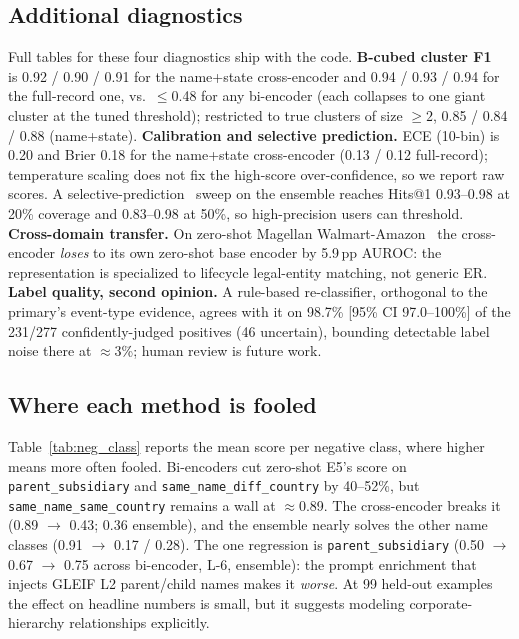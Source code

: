 \documentclass[sigconf]{acmart}
\begin{document}
\subsection{Additional diagnostics}
\label{ssec:diagnostics}

Full tables for these four diagnostics ship with the code.
\textbf{B-cubed cluster F1}~\cite{binette2024} is 0.92 / 0.90 /
0.91 for the name+state cross-encoder and 0.94 / 0.93 / 0.94 for
the full-record one, vs.\ $\leq$0.48 for any bi-encoder
(each collapses to one giant cluster at the tuned threshold);
restricted to true clusters of size ${\geq}2$, 0.85 / 0.84 / 0.88
(name+state).
\textbf{Calibration and selective prediction.} ECE (10-bin) is
0.20 and Brier 0.18 for the name+state cross-encoder (0.13 / 0.12
full-record); temperature scaling does not fix the high-score
over-confidence, so we report raw scores. A
selective-prediction~\cite{geifman2017} sweep on the ensemble
reaches Hits@1 0.93--0.98 at 20\% coverage and 0.83--0.98 at 50\%,
so high-precision users can threshold.
\textbf{Cross-domain transfer.} On zero-shot Magellan
Walmart-Amazon~\cite{magellan2016} the cross-encoder \emph{loses}
to its own zero-shot base encoder by 5.9\,pp AUROC: the
representation is specialized to lifecycle legal-entity matching,
not generic ER.
\textbf{Label quality, second opinion.} A rule-based re-classifier,
orthogonal to the primary's event-type evidence, agrees with it on
98.7\% [95\% CI 97.0--100\%] of the 231/277 confidently-judged
positives (46 uncertain), bounding detectable label noise there at
$\approx$3\%; human review is future work.

\subsection{Where each method is fooled}
\label{ssec:negclass}

Table~\ref{tab:neg_class} reports the mean score per negative
class, where higher means more often fooled. Bi-encoders cut
zero-shot E5's score on \texttt{parent\_subsidiary} and
\texttt{same\_name\_diff\_country} by 40--52\%, but
\texttt{same\_name\_same\_country} remains a wall at
$\approx$0.89. The cross-encoder breaks it (0.89 $\to$ 0.43; 0.36
ensemble), and the ensemble nearly solves the other name classes
(0.91 $\to$ 0.17 / 0.28). The one regression is \texttt{parent\_subsidiary}
(0.50 $\to$ 0.67 $\to$ 0.75 across bi-encoder, L-6, ensemble):
the prompt enrichment that injects GLEIF L2 parent/child names
makes it \emph{worse}. At 99 held-out examples the effect on
headline numbers is small, but it suggests modeling
corporate-hierarchy relationships explicitly.
\end{document}
